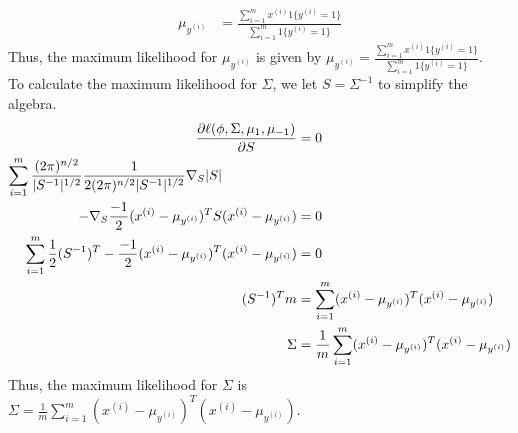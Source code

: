 \documentclass[11pt,a4paper,titlepage]{article}
\begin{document}
{{\begin{align*}
    \\ \mu_{y^{(i)}} &= \frac{\sum_{i=1}^m x^{(i)} 1\{y^{(i)} = 1\}}{\sum_{i=1}^m 1\{y^{(i)} = 1\}}
\end{align*}
Thus, the maximum likelihood for $\mu_{y^{(i)}}$ is given by $\mu_{y^{(i)}} = \frac{\sum_{i=1}^m x^{(i)} 1\{y^{(i)} = 1\}}{\sum_{i=1}^m 1\{y^{(i)} = 1\}}$.
\\ \quad To calculate the maximum likelihood for $\Sigma$, we let $S=\Sigma^{-1}$ to simplify the algebra.
\begin{align*}
	\pdv{\ell(\phi,\Sigma, \mu_{1}, \mu_{-1})}{S} &= 0
    \\ \sum_{i=1}^m  \frac{(2\pi)^{n/2}}{|S^{-1}|^{1/2}} \frac{1}{2(2\pi)^{n/2}|S^{-1}|^{1/2}} \nabla_S|S| \hphantom{(x^{(i)}-\mu_{y^{(i)}})} &
    \\- \nabla_S \frac{-1}{2}(x^{(i)}-\mu_{y^{(i)}})^T S (x^{(i)}-\mu_{y^{(i)}}) &= 0
    \\ \sum_{i=1}^m \frac{1}{2} (S^{-1})^T - \frac{-1}{2}(x^{(i)}-\mu_{y^{(i)}})^T (x^{(i)}-\mu_{y^{(i)}}) &= 0
    \\ (S^{-1})^T m &= \sum_{i=1}^m (x^{(i)}-\mu_{y^{(i)}})^T (x^{(i)}-\mu_{y^{(i)}})
    \\ \Sigma &= \frac{1}{m} \sum_{i=1}^m (x^{(i)}-\mu_{y^{(i)}})^T (x^{(i)}-\mu_{y^{(i)}})
\end{align*}
Thus, the maximum likelihood for $\Sigma$ is $\Sigma = \frac{1}{m} \sum_{i=1}^m (x^{(i)}-\mu_{y^{(i)}})^T (x^{(i)}-\mu_{y^{(i)}})$.
}\label{prob:3c}
}\label{problem 3}
\end{document}
